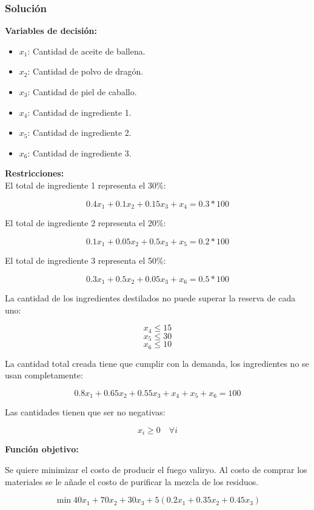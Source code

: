 \documentclass[a4paper,10pt,twocolumn]{article}
\theoremstyle{theorem}
\theoremstyle{definition}
\theoremstyle{remark}
\begin{document}
		\subsubsection{Solución}\label{subsubsec:sol_ejer_3}

\textbf{Variables de decisión:}

\begin{itemize}
	\item $x_1$: Cantidad de aceite de ballena.
	\item $x_2$: Cantidad de polvo de dragón.
	\item $x_3$: Cantidad de piel de caballo.
	\item $x_4$: Cantidad de ingrediente 1.
	\item $x_5$: Cantidad de ingrediente 2.
	\item $x_6$: Cantidad de ingrediente 3.
\end{itemize}

\textbf{Restricciones:}\\

El total de ingrediente 1 representa el 30\%:

$$
0.4 x_1 + 0.1 x_2 + 0.15 x_3 + x_4 = 0.3*100
$$

El total de ingrediente 2 representa el 20\%:

$$
0.1 x_1 + 0.05 x_2 + 0.5 x_3 + x_5 = 0.2*100
$$

El total de ingrediente 3 representa el 50\%:

$$
0.3 x_1 + 0.5 x_2 + 0.05 x_3 + x_6 = 0.5*100
$$

La cantidad de los ingredientes destilados no puede superar la reserva de cada uno:

$$
x_4 \le 15
$$
$$
x_5 \le 30
$$
$$
x_6 \le 10
$$

La cantidad total creada tiene que cumplir con la demanda, los ingredientes no se usan completamente:

$$
0.8 x_1 + 0.65 x_2 + 0.55 x_3 + x_4 + x_5 + x_6 = 100
$$

Las cantidades tienen que ser no negativas:

$$
x_i \ge 0 \quad \forall i
$$

\textbf{Función objetivo:}

Se quiere minimizar el costo de producir el fuego valiryo. Al costo de comprar los materiales se le añade el costo de purificar la mezcla de los residuos.

$$
\min 40 x_1 + 70 x_2 + 30 x_3 + 5 (0.2 x_1 + 0.35 x_2 + 0.45 x_3)
$$
\end{document}
